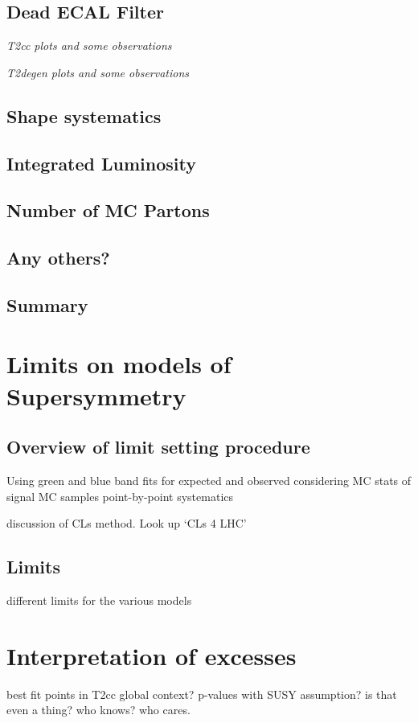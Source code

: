\subsection{Dead ECAL Filter}

\emph{T2cc plots and some observations}

\emph{T2degen plots and some observations}

\subsection{Shape systematics}
\subsection{Integrated Luminosity}
\subsection{Number of MC Partons}
\subsection{Any others?}
\subsection{Summary}

\section{Limits on models of Supersymmetry}  %
\label{sec:interpretation_limits}

\subsection{Overview of limit setting procedure}
Using green and blue band fits for expected and observed
considering MC stats of signal MC samples
point-by-point systematics

discussion of CLs method. Look up `CLs 4 LHC'

\subsection{Limits}
different limits for the various models


\section{Interpretation of excesses}
\label{sec:interpretation_excess}
best fit points in T2cc
global context?
p-values with SUSY assumption? is that even a thing? who knows? who cares.